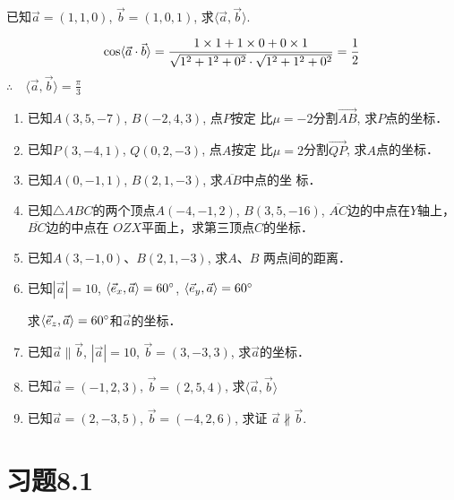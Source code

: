 \begin{example}
    已知$\vec{a}=(1,1,0)$, $\vec{b}=(1,0,1)$, 
求$\langle \vec{a},\vec{b}\rangle$.
\end{example}

\begin{solution}
\[\cos\langle \vec{a}\cdot \vec{b} \rangle=\dfrac{1\times 1+1\times 0+0\times 1}{\sqrt{1^2+1^2+0^2}\cdot \sqrt{1^2+1^2+0^2}}=\dfrac{1}{2} \]
$\therefore\quad \langle \vec{a},\vec{b}\rangle=\frac{\pi}{3}$    
\end{solution}

\begin{ex}
\begin{enumerate}
    \item 已知$A(3,5,-7)$, $B(-2,4,3)$, 点$P$按定
    比$\mu=-2$分割$\Vec{AB}$, 求$P$点的坐标．
    \item 已知$P(3,-4,1)$, $Q(0,2,-3)$, 点$A$按定
    比$\mu=2$分割$\Vec{QP}$, 求$A$点的坐标．
    \item 已知$A(0,-1,1)$, $B(2,1,-3)$, 求$\overline{AB}$中点的坐
    标．
    \item 已知$\triangle ABC$的两个顶点$A(-4,-1,2)$, $B(3,
    5,-16)$, $\overline{AC}$边的中点在$Y$轴上，
    $\overline{BC}$边的中点在
    $OZX$平面上，求第三顶点$C$的坐标．
    \item 已知$A(3,-1,0)$、$B(2,1,-3)$, 求$A$、$B$
    两点间的距离．
    \item 已知$|\vec{a}|=10$, $\langle \vec{e}_x,\vec{a} \rangle=60^{\circ}$, $\langle \vec{e}_y,\vec{a} \rangle=60^{\circ}$

    求$\langle \vec{e}_z,\vec{a} \rangle=60^{\circ}$和$\vec{a}$的坐标．
\item 已知$\vec{a}\parallel \vec{b}$, $|\vec{a}|=10$, $\vec{b}=(3,-3,3)$, 求$\vec{a}$的坐标．

\item 已知$\vec{a}=(-1,2,3)$, $\vec{b}=(2,5,4)$, 求$\langle \vec{a},\vec{b} \rangle$

\item 已知$\vec{a}=(2,-3,5)$, $\vec{b}=(-4,2,6)$, 求证
$\vec{a}\nparallel \vec{b}$.
\end{enumerate}
\end{ex}

\section*{习题8.1}

